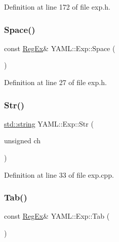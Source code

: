 Definition at line 172 of file exp.\+h.

\mbox{\label{namespace_y_a_m_l_1_1_exp_a81c8e7987a6fd19d3a5fc370ab05bbfc}} 
\subsubsection{\texorpdfstring{Space()}{Space()}}
{\footnotesize\ttfamily const \mbox{\hyperlink{class_y_a_m_l_1_1_reg_ex}{Reg\+Ex}}\& Y\+A\+M\+L\+::\+Exp\+::\+Space (\begin{DoxyParamCaption}{ }\end{DoxyParamCaption})\hspace{0.3cm}{\ttfamily [inline]}}



Definition at line 27 of file exp.\+h.

\mbox{\label{namespace_y_a_m_l_1_1_exp_a2d8533a2c3699d22f183501748704597}} 
\subsubsection{\texorpdfstring{Str()}{Str()}}
{\footnotesize\ttfamily \mbox{\hyperlink{glad_8h_ac83513893df92266f79a515488701770}{std\+::string}} Y\+A\+M\+L\+::\+Exp\+::\+Str (\begin{DoxyParamCaption}\item[{unsigned}]{ch }\end{DoxyParamCaption})}



Definition at line 33 of file exp.\+cpp.

\mbox{\label{namespace_y_a_m_l_1_1_exp_ad887cc88621989229430c76bfa2a2ef7}} 
\subsubsection{\texorpdfstring{Tab()}{Tab()}}
{\footnotesize\ttfamily const \mbox{\hyperlink{class_y_a_m_l_1_1_reg_ex}{Reg\+Ex}}\& Y\+A\+M\+L\+::\+Exp\+::\+Tab (\begin{DoxyParamCaption}{ }\end{DoxyParamCaption})\hspace{0.3cm}{\ttfamily [inline]}}



